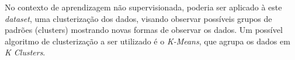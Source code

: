 No contexto de aprendizagem não supervisionada, poderia ser aplicado 
à este \textit{dataset}, uma clusterização dos dados, visando observar possíveis grupos de padrões (clusters) mostrando novas formas de observar os dados. Um possível algoritmo de clusterização a ser utilizado é o \textit{K-Means}, que agrupa os dados em \textit{K Clusters}. 